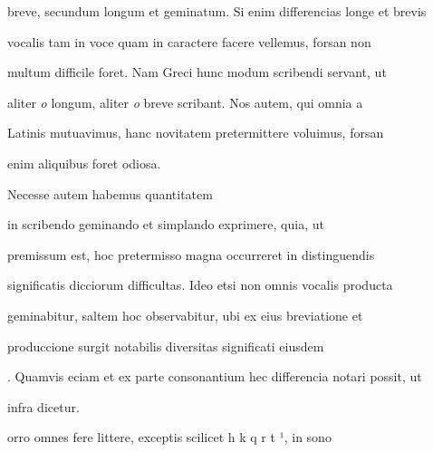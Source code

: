 breve, secundum longum et geminatum. Si enim differencias longe et brevis

vocalis tam in voce quam in caractere facere vellemus, forsan non

multum difficile foret. Nam Greci hunc modum scribendi servant, ut

aliter \textit{o} longum, aliter \textit{o} breve scribant. Nos autem, qui omnia a

Latinis mutuavimus, hanc novitatem pretermittere voluimus, forsan

\splitlines{}

enim aliquibus foret odiosa.

\indentK Necesse autem habemus quantitatem 

\fulllines{}

 in scribendo geminando et simplando exprimere, quia, ut

premissum est, hoc pretermisso magna occurreret in distinguendis

significatis dicciorum difficultas. Ideo etsi non omnis vocalis producta

geminabitur, saltem hoc observabitur, ubi ex eius breviatione et

produccione surgit notabilis diversitas significati eiusdem 

. Quamvis eciam et ex parte consonantium hec differencia notari possit, ut

\splitlines{}



infra dicetur.

\indentK {}orro omnes fere littere, exceptis scilicet  h  k q r t ¹, in sono 

